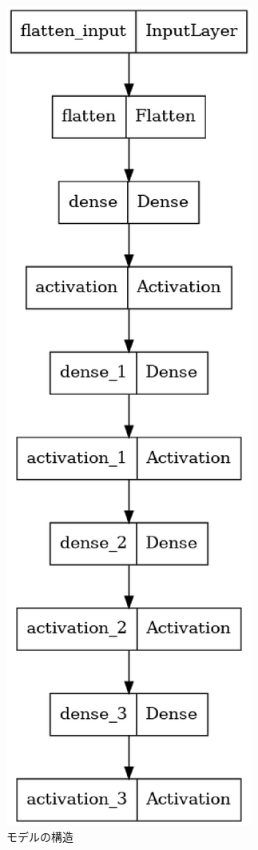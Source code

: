 \documentclass{jarticle}     %
\begin{document}
\begin{figure}
  \centering
  \includegraphics[scale=0.4]{assets/model.eps}
  \caption{モデルの構造}
  \label{fig:model}
\end{figure}
\end{document}
